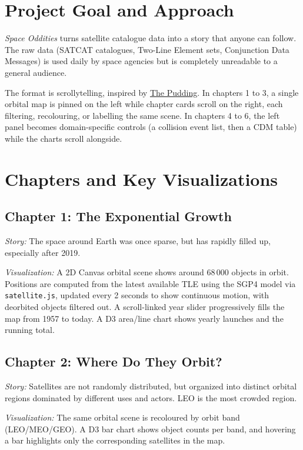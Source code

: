 \section{Project Goal and Approach}

\textit{Space Oddities} turns satellite catalogue data into a story that anyone can follow.
The raw data (SATCAT catalogues, Two-Line Element sets, Conjunction Data Messages) is used daily by space agencies but is completely unreadable to a general audience.

The format is scrollytelling, inspired by \href{https://pudding.cool/2017/10/satellites/}{The Pudding}.
In chapters 1 to 3, a single orbital map is pinned on the left while chapter cards scroll on the right, each filtering, recolouring, or labelling the same scene.
In chapters 4 to 6, the left panel becomes domain-specific controls (a collision event list, then a CDM table) while the charts scroll alongside.

\section{Chapters and Key Visualizations}

\subsection{Chapter 1: The Exponential Growth}
\textit{Story:} The space around Earth was once sparse, but has rapidly filled up, especially after 2019.

\textit{Visualization:} A 2D Canvas orbital scene shows around 68\,000 objects in orbit. Positions are computed from the latest available TLE using the SGP4 model via \texttt{satellite.js}, updated every 2 seconds to show continuous motion, with deorbited objects filtered out. A scroll-linked year slider progressively fills the map from 1957 to today. A D3 area/line chart shows yearly launches and the running total.

\subsection{Chapter 2: Where Do They Orbit?}
\textit{Story:} Satellites are not randomly distributed, but organized into distinct orbital regions dominated by different uses and actors. LEO is the most crowded region.

\textit{Visualization:} The same orbital scene is recoloured by orbit band (LEO/MEO/GEO). A D3 bar chart shows object counts per band, and hovering a bar highlights only the corresponding satellites in the map.

